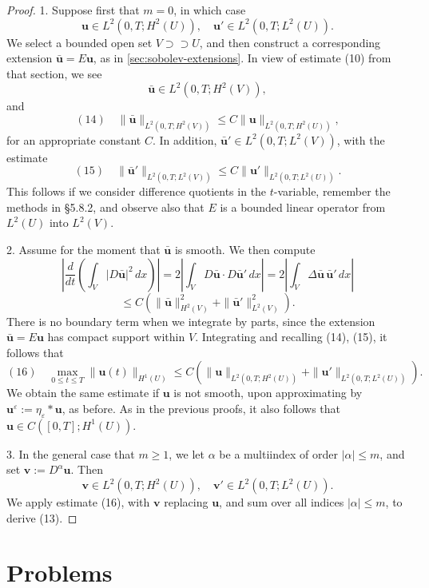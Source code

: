 \begin{proof}
1. Suppose first that $m=0$, in which case
$$\mathbf{u} \in L^2(0,T;H^2(U)), \quad \mathbf{u}' \in L^2(0,T;L^2(U)).$$
We select a bounded open set $V \supset\supset U$, and then construct a corresponding extension $\bar{\mathbf{u}} = E\mathbf{u}$, as in \cref{sec:sobolev-extensions}. In view of estimate (10) from that section, we see
$$\bar{\mathbf{u}} \in L^2(0,T;H^2(V)),$$
and
$$(14) \quad \|\bar{\mathbf{u}}\|_{L^2(0,T;H^2(V))} \le C\|\mathbf{u}\|_{L^2(0,T;H^2(U))},$$
for an appropriate constant $C$. In addition, $\bar{\mathbf{u}}' \in L^2(0,T;L^2(V))$, with the estimate
$$(15) \quad \|\bar{\mathbf{u}}'\|_{L^2(0,T;L^2(V))} \le C\|\mathbf{u}'\|_{L^2(0,T;L^2(U))}.$$
This follows if we consider difference quotients in the $t$-variable, remember the methods in §5.8.2, and observe also that $E$ is a bounded linear operator from $L^2(U)$ into $L^2(V)$.

2. Assume for the moment that $\bar{\mathbf{u}}$ is smooth. We then compute
$$\left|\frac{d}{dt}\left(\int_V |D\bar{\mathbf{u}}|^2\,dx\right)\right| = 2\left|\int_V D\bar{\mathbf{u}} \cdot D\bar{\mathbf{u}}'\,dx\right| = 2\left|\int_V \Delta\bar{\mathbf{u}}\, \bar{\mathbf{u}}'\,dx\right|$$
$$\le C\left(\|\bar{\mathbf{u}}\|^2_{H^2(V)} + \|\bar{\mathbf{u}}'\|^2_{L^2(V)}\right).$$
There is no boundary term when we integrate by parts, since the extension $\bar{\mathbf{u}} = E\mathbf{u}$ has compact support within $V$. Integrating and recalling (14), (15), it follows that
$$(16) \quad \max_{0 \le t \le T} \|\mathbf{u}(t)\|_{H^1(U)} \le C\left(\|\mathbf{u}\|_{L^2(0,T;H^2(U))} + \|\mathbf{u}'\|_{L^2(0,T;L^2(U))}\right).$$
We obtain the same estimate if $\mathbf{u}$ is not smooth, upon approximating by $\mathbf{u}^\varepsilon := \eta_\varepsilon * \mathbf{u}$, as before. As in the previous proofs, it also follows that $\mathbf{u} \in C([0,T];H^1(U))$.

3. In the general case that $m \ge 1$, we let $\alpha$ be a multiindex of order $|\alpha| \le m$, and set $\mathbf{v} := D^\alpha \mathbf{u}$. Then
$$\mathbf{v} \in L^2(0,T;H^2(U)), \quad \mathbf{v}' \in L^2(0,T;L^2(U)).$$
We apply estimate (16), with $\mathbf{v}$ replacing $\mathbf{u}$, and sum over all indices $|\alpha| \le m$, to derive (13).
\end{proof}

\section{Problems}
\label{sec:sobolev-problems}

